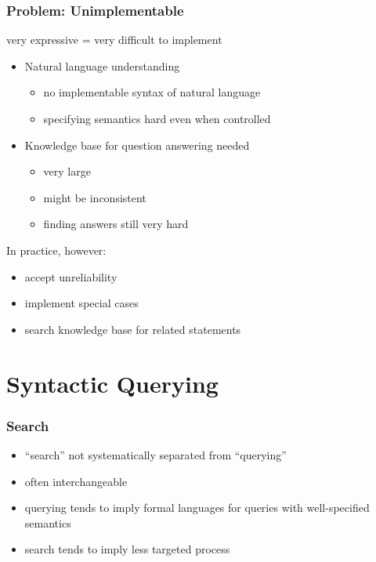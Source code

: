 \begin{frame}\frametitle{Problem: Unimplementable}
very expressive = very difficult to implement
\begin{itemize}
\item Natural language understanding
 \begin{itemize}
 \item no implementable syntax of natural language
 \item specifying semantics hard even when controlled
 \end{itemize}
\item Knowledge base for question answering needed
 \begin{itemize}
 \item very large 
 \item might be inconsistent 
 \item finding answers still very hard
 \end{itemize}
\end{itemize}
 
In practice, however:
\begin{itemize}
 \item accept unreliability 
 \item implement special cases 
 \item search knowledge base for related statements 
\end{itemize}
\end{frame}


\section{Syntactic Querying}

\begin{frame}\frametitle{Search}
\begin{itemize}
\item ``search'' not systematically separated from ``querying''
\item often interchangeable
\item querying tends to imply formal languages for queries with well-specified semantics
\item search tends to imply less targeted process
\end{itemize}
\end{frame}


